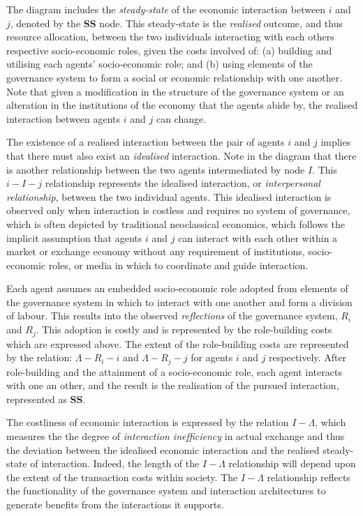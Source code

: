 The diagram includes the \emph{steady-state} of the economic interaction between $i$ and $j$, denoted by the \textbf{SS} node. This steady-state is the \emph{realised} outcome, and thus resource allocation, between the two individuals interacting with each others respective socio-economic roles, given the costs involved of: (a) building and utilising each agents' socio-economic role; and (b) using elements of the governance system to form a social or economic relationship with one another. Note that given a modification in the structure of the governance system or an alteration in the institutions of the economy that the agents abide by, the realised interaction between agents $i$ and $j$ can change.

The existence of a realised interaction between the pair of agents $i$ and $j$ implies that there must also exist an \emph{idealised} interaction. Note in the diagram that there is another relationship between the two agents intermediated by node $I$. This $i-I-j$ relationship represents the idealised interaction, or \emph{interpersonal relationship}, between the two individual agents. This idealised interaction is observed only when interaction is costless and requires no system of governance, which is often depicted by traditional neoclassical economics, which follows the implicit assumption that agents $i$ and $j$ can interact with each other within a market or exchange economy without any requirement of institutions, socio-economic roles, or media in which to coordinate and guide interaction.

Each agent assumes an embedded socio-economic role adopted from elements of the governance system in which to interact with one another and form a division of labour. This results into the observed \emph{reflections} of the governance system, $R_{i}$ and $R_{j}$. This adoption is costly and is represented by the role-building costs which are expressed above. The extent of the role-building costs are represented by the relation: $\Lambda-R_{i}-i$ and $\Lambda-R_{j}-j$ for agents $i$ and $j$ respectively. After role-building and the attainment of a socio-economic role, each agent interacts with one an other, and the result is the realisation of the pursued interaction, represented as \textbf{SS}.

The costliness of economic interaction is expressed by the relation $I-\Lambda$, which measures the the degree of \emph{interaction inefficiency} in actual exchange and thus the deviation between the idealised economic interaction and the realised steady-state of interaction. Indeed, the length of the $I-\Lambda$ relationship will depend upon the extent of the transaction costs within society. The $I-\Lambda$ relationship reflects the functionality of the governance system and interaction architectures to generate benefits from the interactions it supports. 

